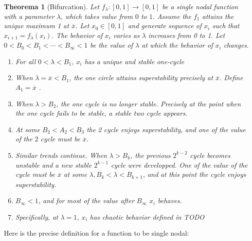 \documentclass{report}
\newtheorem{thm}{Theorema}[chapter]
\theoremstyle{definition}
\theoremstyle{definition}
\theoremstyle{remark}
\newcommand{\mx}{\overline{x}}
\begin{document}
\begin{thm}[Bifurcation]\label{th:general_bifurcation}
	Let $f_{\lambda}: [0,1] \rightarrow [0,1] $ be a single nodal function with a parameter $\lambda$, which takes value from $0$ to $1$. 
	Assume the $f_{1}$ attains the unique maximum 1 at $\mx$.
	Let $x_0 \in [0,1]$ and generate sequence of $x_i$ such that $x_{i+1} = f_{\lambda}(x_i)$.
	The behavior of $x_i$ varies as $\lambda$ increases from 0 to 1. Let $0 < B_0 < B_1 < \cdots < B_{\infty} < 1$ be the value of $\lambda$ at which the behavior of $x_i$ changes.

	\begin{enumerate}
		\item For all $0 <\lambda < B_1$, $x_i$ has a unique and stable one-cycle
		\item When $\lambda = \mx < B_1$, the one circle attains superstability precisely at $\mx$. Define $A_1 = \mx$ .
		\item When $\lambda > B_2$, the one cycle is no longer stable. Precisely at the point when the one cycle fails to be stable, a stable two cycle appears.
		\item At some $B_2 <A_2 < B_3$ the 2 cycle enjoys superstability, and one of the value of the $2$ cycle must be $\mx$.
		\item Similar trends continue. When $\lambda > B_k$, the previous $2^{k-2}$ cycle becomes unstable and a new stable $2^{k-1}$ cycle were developped. One of the value of the cycle must be $\mx$ at some $\lambda, B_k <\lambda < B_{k+1}$, and at this point the cycle enjoys superstability.
		\item $B_{\infty} < 1$, and for most of the value after $B_{\infty}$ $x_i$ behaves. 
		\item Specifically, at $\lambda = 1$, $x_i$ has chaotic behavior defined in TODO
	\end{enumerate}

\end{thm}

Here is the precise definition for a function to be single nodal:

\end{document}

